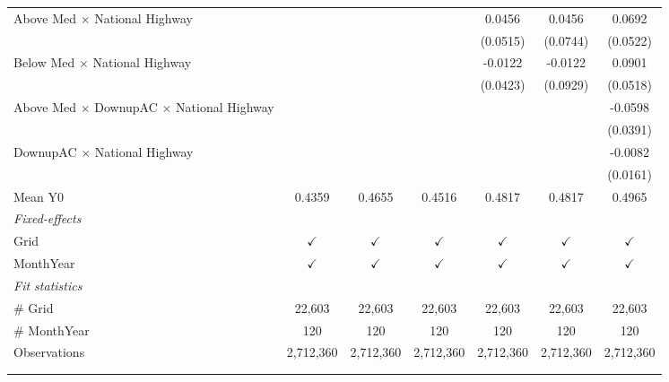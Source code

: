 \begin{table}[htbp]
\begin{tabular}{lcccccc}
      Above Med $\times$ National Highway                     &               &               &               & 0.0456        & 0.0456        & 0.0692\\   
                                                              &               &               &               & (0.0515)      & (0.0744)      & (0.0522)\\   
      Below Med $\times$ National Highway                     &               &               &               & -0.0122       & -0.0122       & 0.0901\\   
                                                              &               &               &               & (0.0423)      & (0.0929)      & (0.0518)\\   
      Above Med $\times$ DownupAC $\times$ National Highway   &               &               &               &               &               & -0.0598\\   
                                                              &               &               &               &               &               & (0.0391)\\   
      DownupAC $\times$ National Highway                      &               &               &               &               &               & -0.0082\\   
                                                              &               &               &               &               &               & (0.0161)\\   
      \hline Mean Y0                                          & 0.4359        & 0.4655        & 0.4516        & 0.4817        & 0.4817        & 0.4965\\  
      \midrule
      \emph{Fixed-effects}\\
      Grid                                                    & $\checkmark$  & $\checkmark$  & $\checkmark$  & $\checkmark$  & $\checkmark$  & $\checkmark$\\   
      MonthYear                                               & $\checkmark$  & $\checkmark$  & $\checkmark$  & $\checkmark$  & $\checkmark$  & $\checkmark$\\   
      \midrule
      \emph{Fit statistics}\\
      \# Grid                                                 & 22,603        & 22,603        & 22,603        & 22,603        & 22,603        & 22,603\\  
      \# MonthYear                                            & 120           & 120           & 120           & 120           & 120           & 120\\  
      Observations                                            & 2,712,360     & 2,712,360     & 2,712,360     & 2,712,360     & 2,712,360     & 2,712,360\\  
      \midrule \midrule
                                                              &               &               &               &               &               &  \tabularnewline 
      \\
   \end{tabular}
\end{table}


